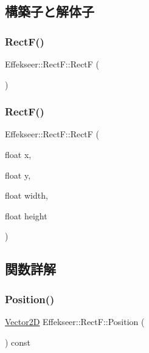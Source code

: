 \subsection{構築子と解体子}
\mbox{\label{struct_effekseer_1_1_rect_f_a938978f15a9b5236289b20224713fcc2}} 
\subsubsection{\texorpdfstring{Rect\+F()}{RectF()}\hspace{0.1cm}{\footnotesize\ttfamily [1/2]}}
{\footnotesize\ttfamily Effekseer\+::\+Rect\+F\+::\+RectF (\begin{DoxyParamCaption}{ }\end{DoxyParamCaption})}

\mbox{\label{struct_effekseer_1_1_rect_f_a72f2fdfae676fc5b0bd9925d323c7ac9}} 
\subsubsection{\texorpdfstring{Rect\+F()}{RectF()}\hspace{0.1cm}{\footnotesize\ttfamily [2/2]}}
{\footnotesize\ttfamily Effekseer\+::\+Rect\+F\+::\+RectF (\begin{DoxyParamCaption}\item[{float}]{x,  }\item[{float}]{y,  }\item[{float}]{width,  }\item[{float}]{height }\end{DoxyParamCaption})}



\subsection{関数詳解}
\mbox{\label{struct_effekseer_1_1_rect_f_a92a8bc17bbb603b380be735070373eea}} 
\subsubsection{\texorpdfstring{Position()}{Position()}}
{\footnotesize\ttfamily \mbox{\hyperlink{struct_effekseer_1_1_vector2_d}{Vector2D}} Effekseer\+::\+Rect\+F\+::\+Position (\begin{DoxyParamCaption}{ }\end{DoxyParamCaption}) const}

